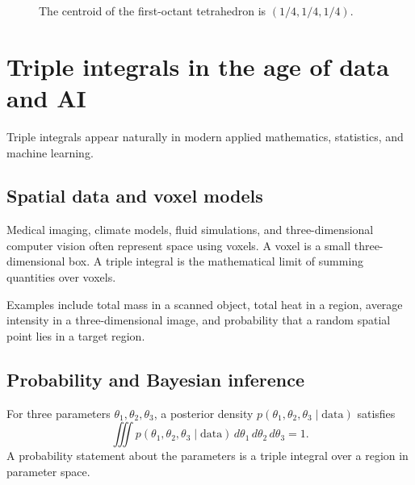 \documentclass[11pt]{article}
\begin{document}
\begin{figure}[H]
\centering
{}
\caption{The centroid of the first-octant tetrahedron is $(1/4,1/4,1/4)$.}
\end{figure}

\section{Triple integrals in the age of data and AI}

Triple integrals appear naturally in modern applied mathematics, statistics, and machine learning.

\subsection*{Spatial data and voxel models}
Medical imaging, climate models, fluid simulations, and three-dimensional computer vision often represent space using voxels. A voxel is a small three-dimensional box. A triple integral is the mathematical limit of summing quantities over voxels.

Examples include total mass in a scanned object, total heat in a region, average intensity in a three-dimensional image, and probability that a random spatial point lies in a target region.

\subsection*{Probability and Bayesian inference}
For three parameters $\theta_1,\theta_2,\theta_3$, a posterior density $p(\theta_1,\theta_2,\theta_3\mid \text{data})$ satisfies
\[
\iiint p(\theta_1,\theta_2,\theta_3\mid \text{data})\,d\theta_1\,d\theta_2\,d\theta_3=1.
\]
A probability statement about the parameters is a triple integral over a region in parameter space.
\end{document}
